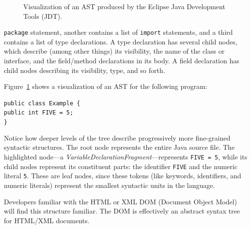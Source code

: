 \documentclass[prodmode]{acmlarge}
\newcommand{\ttt}[1]{\texttt{#1}}
\begin{document}
\begin{figure}
\caption{Visualization of an AST produced by the Eclipse Java Development Tools
(JDT).\vspace*{-4em}}
\label{fig:jdt-ast}
\end{figure}

\noindent
\ttt{package} statement, another
contains a list of \ttt{import} statements, and a third contains a list of type
declarations.  A type declaration has several child nodes, which describe
(among other things) its visibility, the name of the class or interface, and
the field/method declarations in its body.  A field declaration has child nodes
describing its visibility, type, and so forth.

Figure~\ref{fig:jdt-ast} shows a visualization of an AST for the following
program:
\vspace*{.5em}

\noindent \ttt{public class Example \{ \\
\hspace*{.2em} public int FIVE = 5; \\
\}
}

\vspace*{.5em}
Notice how deeper levels of the tree describe progressively more fine-grained
syntactic structures.  The root node represents the entire Java source file.
The highlighted node---a \textit{VariableDeclarationFragment}---represents
\ttt{FIVE = 5}, while its child nodes represent its constituent parts: the
identifier \ttt{FIVE} and the numeric literal \ttt{5}.  These are leaf nodes,
since these tokens (like keywords, identifiers, and numeric literals) represent
the smallest syntactic units in the language.

Developers familiar with the HTML or XML DOM (Document Object Model) will find
this structure familiar.  The DOM is effectively an abstract syntax tree for
HTML/XML documents.
\end{document}
